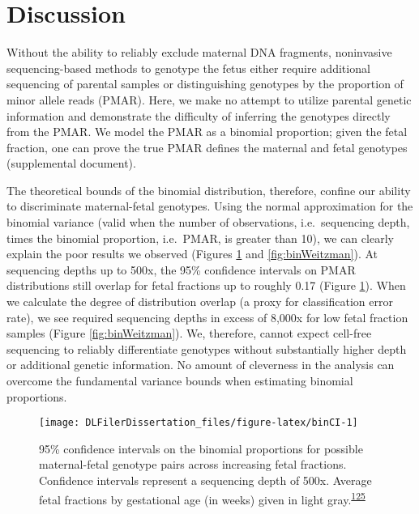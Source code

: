 \documentclass[11pt,letterpaper]{book}
\begin{document}
\hypertarget{discussion-1}{%
\section{Discussion}\label{discussion-1}}

Without the ability to reliably exclude maternal DNA fragments, noninvasive sequencing-based methods to genotype the fetus either require additional sequencing of parental samples or distinguishing genotypes by the proportion of minor allele reads (PMAR).
Here, we make no attempt to utilize parental genetic information and demonstrate the difficulty of inferring the genotypes directly from the PMAR.
We model the PMAR as a binomial proportion; given the fetal fraction, one can prove the true PMAR defines the maternal and fetal genotypes (supplemental document).

The theoretical bounds of the binomial distribution, therefore, confine our ability to discriminate maternal-fetal genotypes.
Using the normal approximation for the binomial variance (valid when the number of observations, i.e.~sequencing depth, times the binomial proportion, i.e.~PMAR, is greater than 10), we can clearly explain the poor results we observed (Figures \ref{fig:binCI} and \ref{fig:binWeitzman}).
At sequencing depths up to 500x, the 95\% confidence intervals on PMAR distributions still overlap for fetal fractions up to roughly 0.17 (Figure \ref{fig:binCI}).
When we calculate the degree of distribution overlap (a proxy for classification error rate), we see required sequencing depths in excess of 8,000x for low fetal fraction samples (Figure \ref{fig:binWeitzman}).
We, therefore, cannot expect cell-free sequencing to reliably differentiate genotypes without substantially higher depth or additional genetic information.
No amount of cleverness in the analysis can overcome the fundamental variance bounds when estimating binomial proportions.





\begin{figure}

{\centering \texttt{[image: DLFilerDissertation\_files/figure-latex/binCI-1]} 

}

\caption[95\% confidence intervals on the binomial proportions for possible maternal-fetal genotype pairs.]{95\% confidence intervals on the binomial proportions for possible maternal-fetal genotype pairs across increasing fetal fractions. Confidence intervals represent a sequencing depth of 500x. Average fetal fractions by gestational age (in weeks) given in light gray.\textsuperscript{\protect\hyperlink{ref-kinnings:2015aa}{125}}}\label{fig:binCI}
\end{figure}
\end{document}
